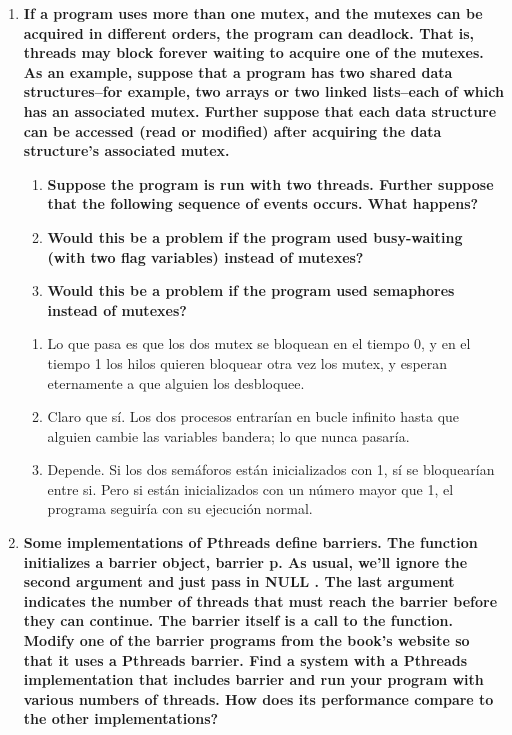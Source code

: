 \documentclass[a4paper,12pt]{article}
\begin{document}
\begin{enumerate}
\begin{lstlisting}
}
\end{lstlisting}

\item{ \textbf{If a program uses more than one mutex, and the mutexes can be acquired in different orders, the program
can deadlock. That is, threads may block forever waiting to acquire one of the mutexes. As an example, suppose that a
program has two shared data structures–for example, two arrays or two linked lists–each of which has an associated mutex.
Further suppose that each data structure can be accessed (read or modified) after acquiring the data structure’s
associated mutex.}

\begin{enumerate}
 \item \textbf{Suppose the program is run with two threads. Further suppose that the following sequence of events occurs. 
What happens?}
 \item  \textbf{Would this be a problem if the program used busy-waiting (with two flag variables) instead of mutexes?}
 \item \textbf{Would this be a problem if the program used semaphores instead of mutexes?}
\end{enumerate}
}

\begin{enumerate}
 \item Lo que pasa es que los dos mutex se bloquean en el tiempo 0, y en el tiempo 1 los hilos quieren bloquear otra vez los
 mutex, y esperan eternamente a que alguien los desbloquee.
 \item Claro que sí. Los dos procesos entrarían en bucle infinito hasta que alguien cambie las variables bandera; lo que nunca
 pasaría.
 \item Depende. Si los dos semáforos están inicializados con 1, sí se bloquearían entre si. Pero si están inicializados con 
 un número mayor que 1, el programa seguiría con su ejecución normal.
\end{enumerate}

\item \textbf{Some implementations of Pthreads define barriers. The function initializes a barrier object, barrier p.
As usual, we’ll ignore the second argument and just pass in NULL . The last argument indicates the number of threads
that must reach the barrier before they can continue. The barrier itself is a call to the function. \\
Modify one of the barrier programs from the book’s website so that it uses a Pthreads barrier. Find a system with a
Pthreads implementation that includes barrier and run your program with various numbers of threads. How does its
performance compare to the other implementations?}



\end{enumerate}
\end{document}
